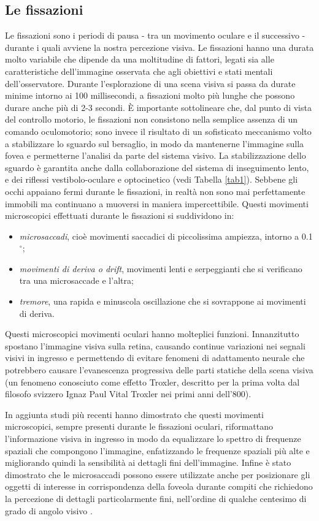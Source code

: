\documentclass[12pt]{article}
\begin{document}
\subsection{Le fissazioni}
Le fissazioni sono i periodi di pausa - tra un movimento oculare e il successivo - durante i quali avviene la nostra percezione visiva. Le fissazioni hanno una durata molto variabile che dipende da una moltitudine di fattori, legati sia alle caratteristiche dell'immagine osservata che agli obiettivi e stati mentali dell'osservatore. Durante l'esplorazione di una scena visiva si passa da durate minime intorno ai 100 millisecondi, a fissazioni molto più lunghe che possono durare anche più di 2-3 secondi. È importante sottolineare che, dal punto di vista del controllo motorio, le fissazioni non consistono nella semplice assenza di un comando oculomotorio; sono invece il risultato di un sofisticato meccanismo volto a stabilizzare lo sguardo sul bersaglio, in modo da mantenerne l'immagine sulla fovea e permetterne l'analisi da parte del sistema visivo. La stabilizzazione dello sguardo è garantita anche dalla collaborazione del sistema di inseguimento lento, e dei riflessi vestibolo-oculare e optocinetico (vedi Tabella \ref{tab1}).
Sebbene gli occhi appaiano fermi durante le fissazioni, in realtà non sono mai perfettamente immobili ma continuano a muoversi in maniera impercettibile. Questi movimenti microscopici effettuati durante le fissazioni si suddividono in: 
\begin{itemize}
\item \textit{microsaccadi}, cioè movimenti saccadici di piccolissima ampiezza, intorno a 0.1$^{\circ}$;
\item \textit{movimenti di deriva o drift}, movimenti lenti e serpeggianti che si verificano tra una microsaccade e l'altra;
\item \textit{tremore}, una rapida e minuscola oscillazione che si sovrappone ai movimenti di deriva.
\end{itemize}
Questi microscopici movimenti oculari hanno molteplici funzioni. Innanzitutto spostano l'immagine visiva sulla retina, causando continue variazioni nei segnali visivi in ingresso e permettendo di evitare fenomeni di adattamento neurale che potrebbero causare l'evanescenza progressiva delle parti statiche della scena visiva (un fenomeno conosciuto come effetto Troxler, descritto per la prima volta dal filosofo svizzero Ignaz Paul Vital Troxler nei primi anni dell'800). 

In aggiunta studi più recenti hanno dimostrato che questi movimenti microscopici, sempre presenti durante le fissazioni oculari, riformattano l'informazione visiva in ingresso in modo da equalizzare lo spettro di frequenze spaziali che compongono l'immagine, enfatizzando le frequenze spaziali più alte \cite{Rucci2015} e migliorando quindi la sensibilità ai dettagli fini dell'immagine. Infine è stato dimostrato che le microsaccadi possono essere utilizzate anche per posizionare gli oggetti di interesse in corrispondenza della foveola durante compiti che richiedono la percezione di dettagli particolarmente fini, nell'ordine di qualche centesimo di grado di angolo visivo \cite{Ko2010a,Rucci2007}. 
\end{document}
